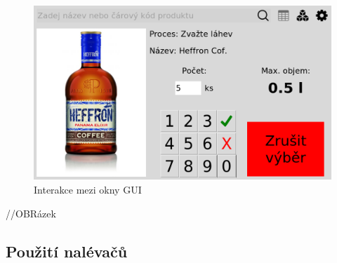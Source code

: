 \begin{figure}[H]
    \begin{center}
        \includegraphics[scale=0.4]{obrazky/GUI Numericka klavesnice.png}
    \end{center}
    \caption{Interakce mezi okny GUI}
    \label{Interakce mezi okny GUI}
\end{figure}

//OBRázek


\subsection{Použití nalévačů}

